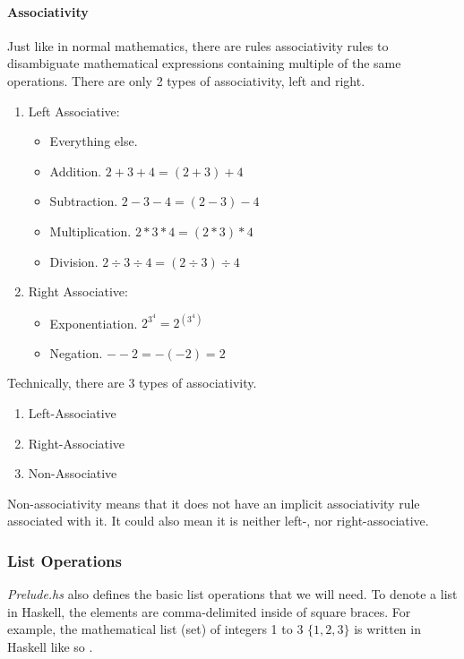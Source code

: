 \paragraph{Associativity}\label{par:Math_Associativity}
Just like in normal mathematics, there are rules associativity rules to disambiguate mathematical expressions containing multiple of the same operations.
There are only 2 types of associativity, left and right.
\begin{enumerate}[noitemsep]
\item Left Associative:
  \begin{itemize}[noitemsep]
  \item Everything else.
  \item Addition. $2+3+4 = (2+3)+4$
  \item Subtraction. $2-3-4 = (2-3)-4$
  \item Multiplication. $2*3*4 = (2*3)*4$
  \item Division. $2 \div 3 \div 4 = (2 \div 3) \div 4$
  \end{itemize}
\item Right Associative:
  \begin{itemize}[noitemsep]
  \item Exponentiation. $2^{3^{4}} = 2^{(3^{4})}$
  \item Negation. $--2 = -(-2) = 2$
  \end{itemize}
\end{enumerate}

\begin{remark*}
  Technically, there are 3 types of associativity.
  \begin{enumerate}[noitemsep]
  \item Left-Associative
  \item Right-Associative
  \item Non-Associative
  \end{enumerate}

  Non-associativity means that it does not have an implicit associativity rule associated with it.
  It could also mean it is neither left-, nor right-associative.
\end{remark*}

\subsubsection{List Operations}\label{subsubsec:List_Ops}
\emph{Prelude.hs} also defines the basic list operations that we will need.
To denote a list in Haskell, the elements are comma-delimited inside of square braces.
For example, the mathematical list (set) of integers 1 to 3 $\lbrace 1, 2, 3 \rbrace$ is written in Haskell like so \haskellinline{[1, 2, 3]}.

